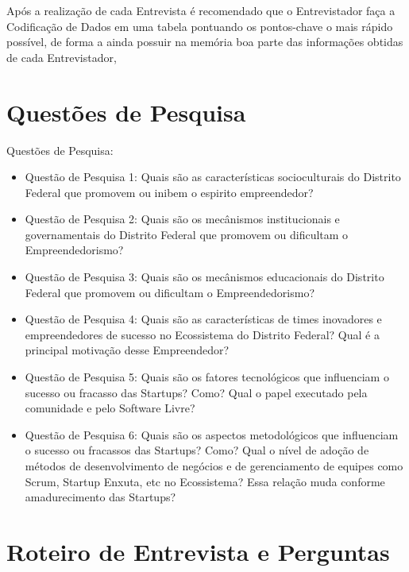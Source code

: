Após a realização de cada Entrevista é recomendado que o Entrevistador faça a Codificação de Dados em uma tabela pontuando os pontos-chave o mais rápido possível, de forma a ainda possuir na memória
boa parte das informações obtidas de cada Entrevistador,

\section{Questões de Pesquisa}
\label{subsection:questoes_de_pesquisa}

Questões de Pesquisa:
\begin{itemize}
  \item Questão de Pesquisa 1: Quais são as características socioculturais do Distrito Federal que promovem ou inibem o espirito empreendedor?
  \item Questão de Pesquisa 2: Quais são os mecânismos institucionais e governamentais do Distrito Federal que promovem ou dificultam o Empreendedorismo?
  \item Questão de Pesquisa 3: Quais são os mecânismos educacionais do Distrito Federal que promovem ou dificultam o Empreendedorismo?
  \item Questão de Pesquisa 4: Quais são as características de times inovadores e empreendedores de sucesso no Ecossistema do Distrito Federal? Qual é a principal motivação desse Empreendedor?
  \item Questão de Pesquisa 5: Quais são os fatores tecnológicos que influenciam o sucesso ou fracasso das Startups? Como? Qual o papel executado pela comunidade e pelo Software Livre?
  \item Questão de Pesquisa 6: Quais são os aspectos metodológicos que influenciam o sucesso ou fracassos das Startups? Como? Qual o nível de adoção de métodos de desenvolvimento de negócios
  e de gerenciamento de equipes como Scrum, Startup Enxuta, etc no Ecossistema? Essa relação muda conforme amadurecimento das Startups?
\end{itemize}

\section{Roteiro de Entrevista e Perguntas}
\label{subsection:questoes_de_pesquisa}

